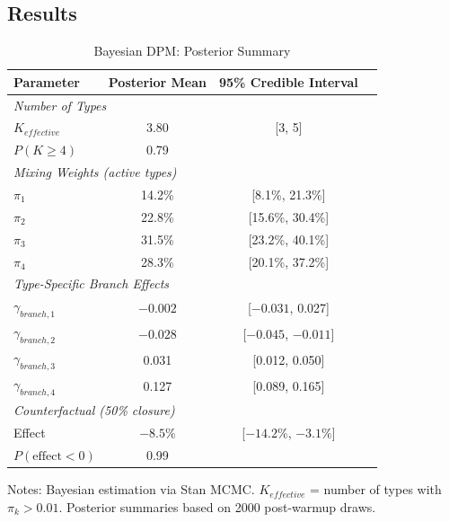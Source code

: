 \documentclass[12pt]{article}
\begin{document}
\subsection{Results}

\begin{table}[H]
\centering
\caption{Bayesian DPM: Posterior Summary}
\label{tab:bayesian}
\begin{threeparttable}
\begin{tabular}{lccc}
\toprule
Parameter & Posterior Mean & 95\% Credible Interval \\
\midrule
\multicolumn{3}{l}{\textit{Number of Types}} \\
$K_{effective}$ & 3.80 & [3, 5] \\
$P(K \geq 4)$ & 0.79 & \\
\midrule
\multicolumn{3}{l}{\textit{Mixing Weights (active types)}} \\
$\pi_1$ & 14.2\% & [8.1\%, 21.3\%] \\
$\pi_2$ & 22.8\% & [15.6\%, 30.4\%] \\
$\pi_3$ & 31.5\% & [23.2\%, 40.1\%] \\
$\pi_4$ & 28.3\% & [20.1\%, 37.2\%] \\
\midrule
\multicolumn{3}{l}{\textit{Type-Specific Branch Effects}} \\
$\gamma_{branch,1}$ & $-0.002$ & [$-0.031$, 0.027] \\
$\gamma_{branch,2}$ & $-0.028$ & [$-0.045$, $-0.011$] \\
$\gamma_{branch,3}$ & 0.031 & [0.012, 0.050] \\
$\gamma_{branch,4}$ & 0.127 & [0.089, 0.165] \\
\midrule
\multicolumn{3}{l}{\textit{Counterfactual (50\% closure)}} \\
Effect & $-8.5\%$ & [$-14.2\%$, $-3.1\%$] \\
$P(\text{effect} < 0)$ & 0.99 & \\
\bottomrule
\end{tabular}
\begin{tablenotes}
\small
\item Notes: Bayesian estimation via Stan MCMC. $K_{effective}$ = number of types with $\pi_k > 0.01$. Posterior summaries based on 2000 post-warmup draws.
\end{tablenotes}
\end{threeparttable}
\end{table}
\end{document}
